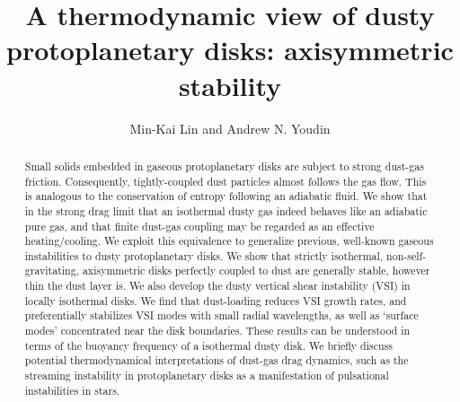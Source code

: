 \documentclass[iop, numberedappendix]{emulateapj}
\begin{document}
\title{A thermodynamic view of dusty protoplanetary disks:
  axisymmetric stability}  
\author{Min-Kai Lin and Andrew N. Youdin}

\begin{abstract}
  Small solids embedded in gaseous protoplanetary disks are subject
  to strong dust-gas friction. Consequently, tightly-coupled dust
  particles almost follows the gas flow. 
  This is analogous to the 
  conservation of entropy 
  following an adiabatic fluid.  We show that in the strong drag
  limit that an isothermal dusty gas indeed behaves like an  
  adiabatic pure gas, and that finite dust-gas coupling may be
  regarded as an effective 
  heating/cooling. We exploit this equivalence 
  to 
  generalize previous, well-known gaseous instabilities
  to dusty protoplanetary disks.
We show that strictly isothermal, non-self-gravitating, axisymmetric
disks perfectly coupled to dust are generally stable, however thin the
dust layer is.  %
We also develop 
the dusty vertical shear instability (VSI) in locally isothermal
disks. We find that  dust-loading reduces VSI growth rates, and
preferentially stabilizes VSI modes with small radial 
wavelengths, as well as `surface modes' concentrated near the
disk boundaries. These results can be understood in terms of 
the buoyancy frequency of a isothermal dusty disk. 
We briefly discuss potential thermodynamical interpretations of 
dust-gas drag dynamics, such as the streaming instability in
protoplanetary disks as a manifestation of pulsational instabilities
in stars.  
\end{abstract}
\end{document}
